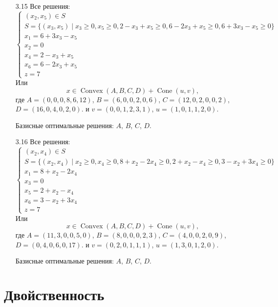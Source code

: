 \documentclass[12pt]{article}
\DeclareMathOperator{\Convex}{Convex}
\DeclareMathOperator{\cone}{Cone}
\begin{document}
\begin{enumerate}
  \item[3.15] Все решения:
  \[
  \begin{cases}
    (x_2, x_5) \in S\\
    S = \{ (x_3, x_5) \mid x_3 \geq 0, x_5 \geq 0, 2 - x_3 + x_5 \geq 0, 6 - 2x_3 + x_5 \geq 0, 6+3x_3-x_5\geq 0 \} \\
    x_1 = 6 + 3x_3 - x_5\\
    x_2 = 0 \\
    x_4 = 2 - x_3 + x_5 \\ 
    x_6 = 6 - 2x_3 + x_5 \\
    z = 7
  \end{cases} 
  \]
  Или
  \[
  x \in \Convex(A, B, C, D)  + \cone(u, v),
  \]
  где $A = (0, 0, 0, 8, 6, 12)$, $B = (6, 0, 0, 2, 0, 6)$, $C = (12, 0, 2, 0, 0, 2)$, $D = (16, 0, 4, 0, 2, 0)$. 
  и $v = (0, 0, 1, 2, 3, 1)$, $u = (1, 0, 1, 1, 2, 0)$.

  Базисные оптимальные решения: $A$, $B$, $C$, $D$.

  \item[3.16] Все решения:
  \[
  \begin{cases}
    (x_2, x_4) \in S\\
    S = \{ (x_2, x_4) \mid x_2 \geq 0, x_4 \geq 0, 8 + x_2 - 2x_4 \geq 0, 2 + x_2 - x_4 \geq 0, 3 - x_2 + 3x_4 \geq 0 \} \\
    x_1 = 8 + x_2 - 2x_4\\
    x_3 = 0 \\
    x_5 = 2 + x_2 - x_4 \\ 
    x_6 = 3 - x_2 + 3x_4 \\
    z = 7
  \end{cases} 
  \]
  Или
  \[
  x \in \Convex(A, B, C, D)  + \cone(u, v),
  \]
  где $A = (11, 3, 0, 0, 5, 0)$, $B = (8, 0, 0, 0, 2, 3)$, $C = (4, 0, 0, 2, 0, 9)$, $D = (0, 4, 0, 6, 0, 17)$. 
  и $v = (0, 2, 0, 1, 1, 1)$, $u = (1, 3, 0, 1, 2, 0)$.

  Базисные оптимальные решения: $A$, $B$, $C$, $D$.

\end{enumerate}

\section*{Двойственность}
\end{document}
